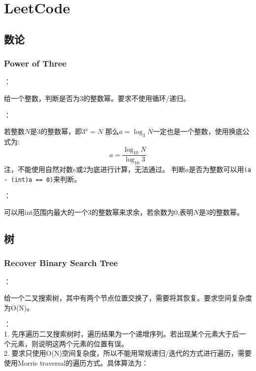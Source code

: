 \chapter{LeetCode}
\section{数论}
\subsection{Power of Three}

：

给一个整数，判断是否为3的整数幂。要求不使用循环/递归。

：

若整数$N$是3的整数幂，即$3^a = N$ 那么$a = \log_3 N$一定也是一个整数，使用换底公式为:
\begin{equation*}
    a = \frac{\log_{10} N}{\log_{10} 3} 
\end{equation*}
注，不能使用自然对数$e$或2为底进行计算，无法通过。
判断$a$是否为整数可以用\texttt{(a - (int)a == 0)}来判断。

：

可以用int范围内最大的一个3的整数幂来求余，若余数为0,表明$N$是3的整数幂。

\section{树}
\subsection{Recover Binary Search Tree}

：

给一个二叉搜索树，其中有两个节点位置交换了，需要将其恢复。要求空间复杂度为O(N)。

： \\
1. 先序遍历二叉搜索树时，遍历结果为一个递增序列。若出现某个元素大于后一个元素，则说明这两个元素的位置有误。\\
2. 要求只使用O(N)空间复杂度，所以不能用常规递归/迭代的方式进行遍历，需要使用Morris traversal的遍历方式。具体算法为：\\

